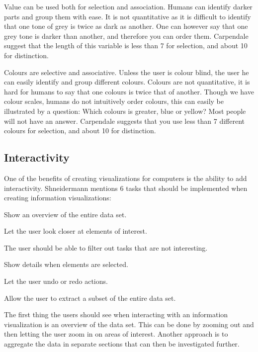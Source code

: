 Value can be used both for selection and association. Humans can identify darker parts and group them with ease. It is not quantitative as it is difficult to identify that one tone of grey is twice as dark as another. One can however say that one grey tone is darker than another, and therefore you can order them. Carpendale suggest that the length of this variable is less than 7 for selection, and about 10 for distinction.

Colours are selective and associative. Unless the user is colour blind, the user he can easily identify and group different colours. Colours are not quantitative, it is hard for humans to say that one colours is twice that of another. Though we have colour scales, humans do not intuitively order colours, this can easily be illustrated by a question: Which colours is greater, blue or yellow? Most people will not have an answer. Carpendale suggests that you use less than 7 different colours for selection, and about 10 for distinction.

\subsection{Interactivity}
One of the benefits of creating visualizations for computers is the ability to add interactivity. Shneidermann mentions 6 tasks that should be implemented when creating information visualizations:
\vspace{-3mm}
\begin{description}[itemsep=0cm, parsep=0cm]
  \item[Overview] Show an overview of the entire data set.
  \item[Zoom] Let the user look closer at elements of interest.
  \item[Filter] The user should be able to filter out tasks that are not interesting.
  \item[Details-on-demand] Show details when elements are selected.
  \item[History] Let the user undo or redo actions.
  \item[Extract] Allow the user to extract a subset of the entire data set.
\end{description}

The first thing the users should see when interacting with an information visualization is an overview of the data set. This can be done by zooming out and then letting the user zoom in on areas of interest. Another approach is to aggregate the data in separate sections that can then be investigated further.

